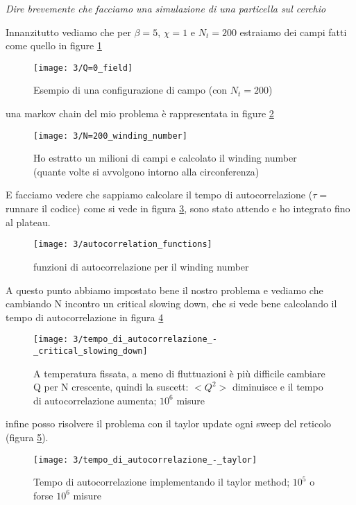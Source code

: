 
\begin{centering}
	\emph{Dire brevemente che facciamo una simulazione di una particella sul cerchio}
\end{centering}

Innanzitutto vediamo che per $\beta=5$, $\chi=1$ e $N_t=200$ estraiamo dei campi fatti come quello in figure \ref{fig:field}
\begin{figure}[htbp]
	\centering
	\texttt{[image: 3/Q=0\_field]}
	\caption{Esempio di una configurazione di campo (con $N_t=200$)}
	\label{fig:field}
\end{figure}

una markov chain del mio problema è rappresentata in figure \ref{fig:windingnumber}
\begin{figure}[htbp]
	\centering
	\texttt{[image: 3/N=200\_winding\_number]}
	\caption{Ho estratto un milioni di campi e calcolato il winding number (quante volte si avvolgono intorno alla circonferenza)}
	\label{fig:windingnumber}
\end{figure}

E facciamo vedere che sappiamo calcolare il tempo di autocorrelazione ($\tau=$ runnare il codice) come si vede in figura \ref{fig:autocorrelation}, sono stato attendo e ho integrato fino al plateau.

\begin{figure}[htbp]
	\centering
	\texttt{[image: 3/autocorrelation\_functions]}
	\caption{funzioni di autocorrelazione per il winding number}
	\label{fig:autocorrelation}
\end{figure}

A questo punto abbiamo impostato bene il nostro problema e vediamo che cambiando N incontro un critical slowing down, che si vede bene calcolando il tempo di autocorrelazione in figura \ref{fig:tau_criticalslowingdown}

\begin{figure}[htbp]
	\centering
	\texttt{[image: 3/tempo\_di\_autocorrelazione\_-\_critical\_slowing\_down]}
	\caption{A temperatura fissata, a meno di fluttuazioni è più difficile cambiare Q per N crescente, quindi la suscett: $<Q^2>$ diminuisce e il tempo di autocorrelazione aumenta; $10^6$ misure}
	\label{fig:tau_criticalslowingdown}
\end{figure}

infine posso risolvere il problema con il taylor update ogni sweep del reticolo (figura \ref{fig:tau_taylor}).

\begin{figure}
	\centering
	\texttt{[image: 3/tempo\_di\_autocorrelazione\_-\_taylor]}
	\caption{Tempo di autocorrelazione implementando il taylor method; $10^5$ o forse $10^6$ misure}
	\label{fig:tau_taylor}
\end{figure}
